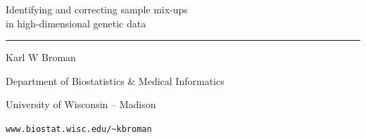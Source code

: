 \documentclass[12pt]{article}
\newcommand{\titlesize}{\fontsize{40}{50} \selectfont}
\newcommand{\headsize}{\fontsize{35}{35} \selectfont}
\newcommand{\textsize}{\fontsize{30}{35} \selectfont}
\newcommand{\smallersize}{\fontsize{20}{25} \selectfont}
\begin{document}
\thispagestyle{empty}

\begin{center}
\titlesize \color{myyellow}

\vspace*{10mm}

{\headsize Identifying and correcting sample mix-ups \\
in high-dimensional genetic data}

\color{mypink}
\rule{10in}{1mm}

\vspace{10mm}

\textsize \color{myblue}
Karl W Broman
\vspace{5mm}

{\smallersize Department of Biostatistics \& Medical Informatics

University of Wisconsin -- Madison
\vspace{20mm}


\verb|www.biostat.wisc.edu/~kbroman| 
}

\end{center}


\newpage
\thispagestyle{empty}

\vspace*{-0.85in}
\end{document}
